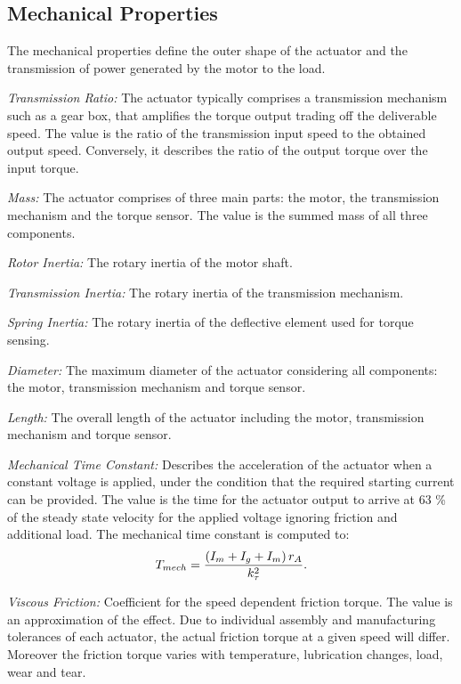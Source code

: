 \documentclass[a4paper,10pt]{cjtdsheet}      %
\begin{document}
\begin{multicols}{2}

%
%
\subsection*{\textcolor{cjtred}{Mechanical Properties}}
The mechanical properties define the outer shape of the actuator and the transmission of power generated by the motor to the load.

\emph{Transmission Ratio:} The actuator typically comprises a transmission mechanism such as a gear box, that amplifies the torque output trading off the deliverable speed. The value is the ratio of the transmission input speed to the obtained output speed. Conversely, it describes the ratio of the output torque over the input torque.

\emph{Mass:} The actuator comprises of three main parts: the motor, the transmission mechanism and the torque sensor. The value is the summed mass of all three components.

\emph{Rotor Inertia:} The rotary inertia of the motor shaft.

\emph{Transmission Inertia:} The rotary inertia of the transmission mechanism.

\emph{Spring Inertia:} The rotary inertia of the deflective element used for torque sensing.

\emph{Diameter:} The maximum diameter of the actuator considering all components: the motor, transmission mechanism and torque sensor.

\emph{Length:} The overall length of the actuator including the motor, transmission mechanism and torque sensor.

\emph{Mechanical Time Constant:} Describes the acceleration of the actuator when a constant voltage is applied, under the condition that the required starting current can be provided. The value is the time for the actuator output to arrive at 63 \% of the steady state velocity for the applied voltage ignoring friction and additional load. The mechanical time constant is computed to:
\begin{equation}
T_{mech} = \frac{
	\left(
		  I_m 
		+ I_g 
		+ I_m
	\right)
	r_A
	}
	{
	 k_\tau^2
	}.
\end{equation}

\emph{Viscous Friction:} Coefficient for the speed dependent friction torque. The value is an approximation of the effect. Due to individual assembly and manufacturing tolerances of each actuator, the actual friction torque at a given speed will differ. Moreover the friction torque varies with temperature, lubrication changes, load, wear and tear.


\end{multicols}
\end{document}
